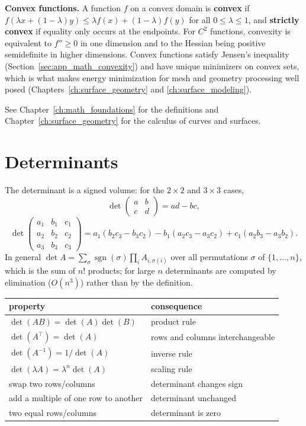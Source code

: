 \medskip
\noindent\textbf{Convex functions.}
A function $f$ on a convex domain is \textbf{convex} if
$f(\lambda x + (1-\lambda) y) \le \lambda f(x) + (1-\lambda) f(y)$ for all
$0 \le \lambda \le 1$, and \textbf{strictly convex} if equality only occurs at
the endpoints. For $C^2$ functions, convexity is equivalent to $f'' \ge 0$ in
one dimension and to the Hessian being positive semidefinite in higher
dimensions. Convex functions satisfy Jensen's inequality
(Section~\ref{sec:app_math_convexity}) and have unique minimizers on convex
sets, which is what makes energy minimization for mesh and geometry
processing well posed (Chapters~\ref{ch:surface_geometry} and
\ref{ch:surface_modeling}).

See Chapter~\ref{ch:math_foundations} for the definitions and
Chapter~\ref{ch:surface_geometry} for the calculus of curves and surfaces.

\section{Determinants}
\label{sec:app_math_determinants}

The determinant is a signed volume: for the $2 \times 2$ and $3 \times 3$
cases,
\[
  \det\begin{pmatrix} a & b \\ c & d \end{pmatrix} = ad - bc,
\]
\[
  \det\begin{pmatrix}
    a_1 & b_1 & c_1\\
    a_2 & b_2 & c_2\\
    a_3 & b_3 & c_3
  \end{pmatrix}
  = a_1(b_2 c_3 - b_3 c_2) - b_1(a_2 c_3 - a_3 c_2)
    + c_1(a_2 b_3 - a_3 b_2).
\]
In general $\det A = \sum_\sigma \operatorname{sgn}(\sigma) \prod_i A_{i,\sigma(i)}$
over all permutations $\sigma$ of $\{1,\dots,n\}$, which is the sum of
$n!$ products; for large $n$ determinants are computed by elimination
($O(n^3)$) rather than by the definition.

\begin{center}
\begin{tabular}{ll}
\toprule
property & consequence \\
\midrule
$\det(AB) = \det(A)\det(B)$ & product rule \\
$\det(A^\top) = \det(A)$ & rows and columns interchangeable \\
$\det(A^{-1}) = 1 / \det(A)$ & inverse rule \\
$\det(\lambda A) = \lambda^n \det(A)$ & scaling rule \\
swap two rows/columns & determinant changes sign \\
add a multiple of one row to another & determinant unchanged \\
two equal rows/columns & determinant is zero \\
\bottomrule
\end{tabular}
\end{center}

